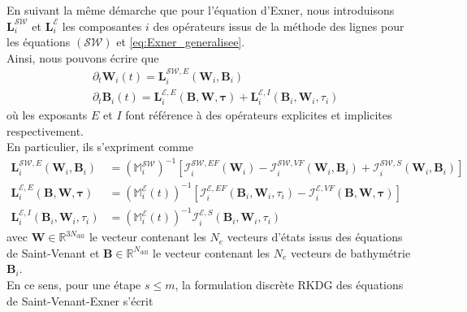 \documentclass[11pt, a4paper, oneside]{report}
\begin{document}
En suivant la même démarche que pour l'équation d'Exner, nous introduisons $\bm{L}_i^\mathcal{SW}$ et $\bm{L}_i^\mathcal{E}$ les composantes $i$ des opérateurs issus de la méthode des lignes pour les équations $(\mathcal{SW})$ et \eqref{eq:Exner_generalisee}. \\
Ainsi, nous pouvons écrire que
\begin{equation}
    \begin{aligned}
        & \partial_t \bm{W}_i(t) = \bm{L}_i^{\mathcal{SW}, E} \left( \bm{W}_i, \bm{B}_i \right) \\
        & \partial_t \bm{B}_i(t) = \bm{L}_i^{\mathcal{E}, E} \left( \bm{B}, \bm{W}, \bm{\tau} \right) + \bm{L}_i^{\mathcal{E}, I} \left( \bm{B}_i, \bm{W}_i, \tau_i \right)
    \end{aligned}
\end{equation}
où les exposants $E$ et $I$ font référence à des opérateurs explicites et implicites respectivement. \\
En particulier, ils s'expriment comme
\begin{equation}
    \begin{aligned}
        \bm{L}_i^{\mathcal{SW}, E} \left( \bm{W}_i, \bm{B}_i \right) & = \left( \mathbb{M}_i^\mathcal{SW} \right)^{-1} \left[ \bm{\mathcal{I}}_i^{\mathcal{SW}, EF} \left( \bm{W}_i \right) - \bm{\mathcal{I}}_i^{\mathcal{SW}, VF} \left( \bm{W}_i, \bm{B}_i \right) + \bm{\mathcal{I}}_i^{\mathcal{SW}, S} \left( \bm{W}_i, \bm{B}_i \right) \right] \\
        \bm{L}_i^{\mathcal{E}, E} \left( \bm{B}, \bm{W}, \bm{\tau} \right) & = \left( \mathbb{M}_i^\mathcal{E}(t) \right)^{-1} \left[ \bm{\mathcal{I}}_i^{\mathcal{E}, EF} \left( \bm{B}_i, \bm{W}_i, \tau_i \right) - \bm{\mathcal{I}}_i^{\mathcal{E}, VF} \left( \bm{B}, \bm{W}, \bm{\tau} \right) \right] \\
        \bm{L}_i^{\mathcal{E}, I} \left( \bm{B}_i, \bm{W}_i, \tau_i \right) & = \left( \mathbb{M}_i^\mathcal{E}(t) \right)^{-1} \bm{\mathcal{I}}_i^{\mathcal{E}, S} \left( \bm{B}_i, \bm{W}_i , \tau_i \right)
    \end{aligned}
\end{equation}
avec $\bm{W} \in \mathbb{R}^{3N_\text{ddl}}$ le vecteur contenant les $N_e$ vecteurs d'états issus des équations de Saint-Venant et $\bm{B} \in \mathbb{R}^{N_\text{ddl}}$ le vecteur contenant les $N_e$ vecteurs de bathymétrie $\bm{B}_i$. \\
En ce sens, pour une étape $s \leq m$, la formulation discrète RKDG des équations de Saint-Venant-Exner s'écrit
\end{document}
